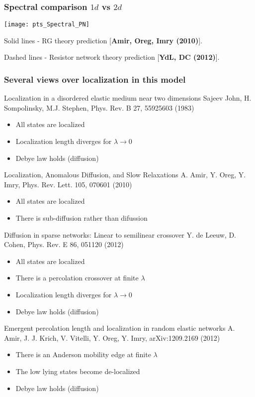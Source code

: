 \documentclass{beamer}
\begin{document}
\begin{frame}
\frametitle{Spectral comparison $1d$ vs $2d$}

\texttt{[image: pts\_Spectral\_PN]}

Solid lines - RG theory prediction [{\bf Amir, Oreg, Imry (2010)}].

Dashed lines  - Resistor network theory prediction [{\bf YdL, DC (2012)}].
\end{frame}
\begin{frame} \frametitle{Several views over localization in this model}
{ \fontsize{8}{7.2}\selectfont
Localization in a disordered elastic medium near two dimensions\newline
Sajeev John, H. Sompolinsky, M.J. Stephen, Phys. Rev. B 27, 55925603 (1983)
\begin{itemize}
\item All states are localized
\item Localization length diverges for $\lambda \rightarrow 0$
\item Debye law holds (diffusion)
\end{itemize}
Localization, Anomalous Diffusion, and Slow Relaxations\newline
A. Amir, Y. Oreg, Y. Imry, Phys. Rev. Lett. 105, 070601 (2010)
\begin{itemize}
\item All states are localized
\item There is sub-diffusion rather than difussion
\end{itemize}
Diffusion in sparse networks: Linear to semilinear crossover \newline
Y. de Leeuw, D. Cohen, Phys. Rev. E 86, 051120 (2012)
\begin{itemize}
\item All states are localized
\item There is a percolation crossover at finite $\lambda$
\item Localization length diverges for $\lambda \rightarrow 0$
\item Debye law holds (diffusion)
\end{itemize}
Emergent percolation length and localization in random elastic networks \newline
A. Amir, J. J. Krich, V. Vitelli, Y. Oreg, Y. Imry, arXiv:1209.2169 (2012)
\begin{itemize}
\item There is an Anderson mobility edge at finite $\lambda$
\item The low lying states become de-localized
\item Debye law holds (diffusion)
\end{itemize}

}
\end{frame}
\end{document}
